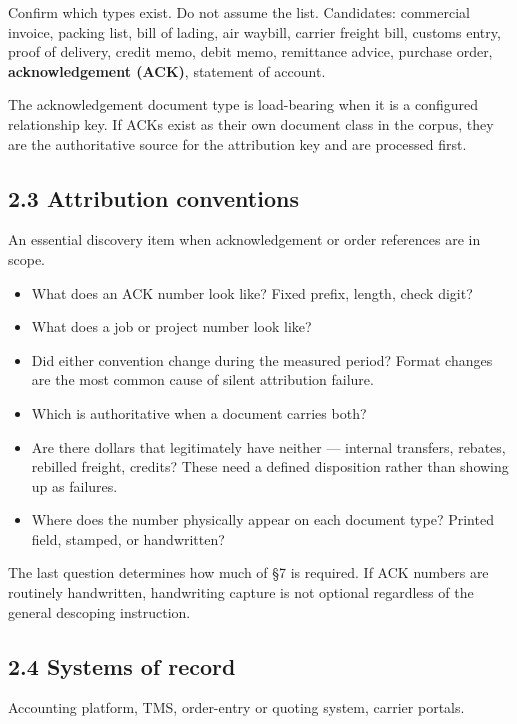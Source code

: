 \documentclass[
]{article}
\providecommand{\tightlist}{%
  \setlength{\itemsep}{0pt}\setlength{\parskip}{0pt}}
\begin{document}
Confirm which types exist. Do not assume the list. Candidates:
commercial invoice, packing list, bill of lading, air waybill, carrier
freight bill, customs entry, proof of delivery, credit memo, debit memo,
remittance advice, purchase order, \textbf{acknowledgement (ACK)},
statement of account.

The acknowledgement document type is load-bearing when it is a
configured relationship key. If ACKs exist as their own document class
in the corpus, they are the authoritative source for the attribution key
and are processed first.

\subsection{2.3 Attribution conventions}\label{attribution-conventions}

An essential discovery item when acknowledgement or order references are
in scope.

\begin{itemize}
\tightlist
\item
  What does an ACK number look like? Fixed prefix, length, check digit?
\item
  What does a job or project number look like?
\item
  Did either convention change during the measured period? Format
  changes are the most common cause of silent attribution failure.
\item
  Which is authoritative when a document carries both?
\item
  Are there dollars that legitimately have neither --- internal
  transfers, rebates, rebilled freight, credits? These need a defined
  disposition rather than showing up as failures.
\item
  Where does the number physically appear on each document type? Printed
  field, stamped, or handwritten?
\end{itemize}

The last question determines how much of §7 is required. If ACK numbers
are routinely handwritten, handwriting capture is not optional
regardless of the general descoping instruction.

\subsection{2.4 Systems of record}\label{systems-of-record}

Accounting platform, TMS, order-entry or quoting system, carrier
portals.
\end{document}

